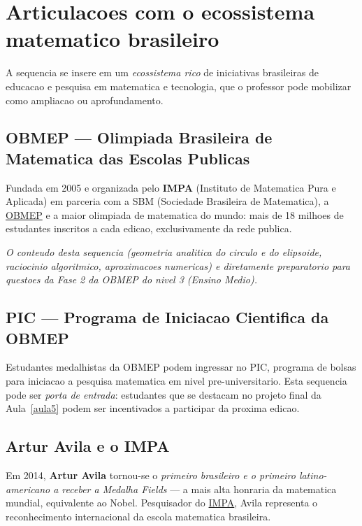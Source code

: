 \documentclass[12pt,a4paper]{scrartcl}
\newcommand{\acc}[1]{\textcolor{accent}{\textbf{#1}}}
\begin{document}
\section{Articulacoes com o ecossistema matematico brasileiro}\label{sec:obmep}

A sequencia se insere em um \emph{ecossistema rico} de iniciativas brasileiras de educacao e pesquisa em matematica e tecnologia, que o professor pode mobilizar como ampliacao ou aprofundamento.

\subsection{OBMEP --- Olimpiada Brasileira de Matematica das Escolas Publicas}

Fundada em 2005 e organizada pelo \acc{IMPA} (Instituto de Matematica Pura e Aplicada) em parceria com a SBM (Sociedade Brasileira de Matematica), a \href{https://www.obmep.org.br/}{OBMEP} e a maior olimpiada de matematica do mundo: mais de 18 milhoes de estudantes inscritos a cada edicao, exclusivamente da rede publica.

\emph{O conteudo desta sequencia (geometria analitica do circulo e do elipsoide, raciocinio algoritmico, aproximacoes numericas) e diretamente preparatorio para questoes da Fase 2 da OBMEP do nivel 3 (Ensino Medio).}

\subsection{PIC --- Programa de Iniciacao Cientifica da OBMEP}

Estudantes medalhistas da OBMEP podem ingressar no PIC, programa de bolsas para iniciacao a pesquisa matematica em nivel pre-universitario. Esta sequencia pode ser \emph{porta de entrada}: estudantes que se destacam no projeto final da Aula~\ref{aula5} podem ser incentivados a participar da proxima edicao.

\subsection{Artur Avila e o IMPA}

Em 2014, \acc{Artur Avila} tornou-se o \emph{primeiro brasileiro e o primeiro latino-americano a receber a Medalha Fields} --- a mais alta honraria da matematica mundial, equivalente ao Nobel. Pesquisador do \href{https://impa.br/}{IMPA}, Avila representa o reconhecimento internacional da escola matematica brasileira.
\end{document}
